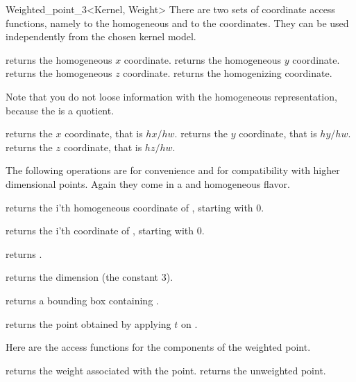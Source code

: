 \begin{ccRefClass} {Weighted_point_3<Kernel, Weight>}
There are two sets of coordinate access functions, namely to the
homogeneous and to the  coordinates. They can be used
independently from the chosen kernel model.

       {returns the homogeneous $x$ coordinate.}
\ccGlue
{}
       {returns the homogeneous $y$ coordinate.}
\ccGlue
{}
       {returns the homogeneous $z$ coordinate.}
\ccGlue
{}
       {returns the homogenizing  coordinate.}

Note that you do not loose information with the homogeneous
representation, because the  is a quotient.

       {returns the  $x$ coordinate, that is $hx/hw$.}
\ccGlue
{}
       {returns the  $y$ coordinate, that is $hy/hw$.}
\ccGlue
{}
       {returns the  $z$ coordinate, that is $hz/hw$.}
       
The following operations are for convenience and for compatibility
with higher dimensional points. Again they come in a
 and homogeneous flavor.

       {returns the i'th homogeneous coordinate of \ccVar, starting with 0.
        }

       {returns the i'th  coordinate of \ccVar, starting with 0.
        }

       {returns .
        }

       {returns the dimension (the constant 3).}

       {returns a bounding box containing \ccVar.}

       {returns the point obtained by applying $t$ on \ccVar.}

Here are the access functions for the components of the weighted point.

       {returns the weight associated with the point.}
\ccGlue
{}
       {returns the unweighted point.}


\end{ccRefClass}
